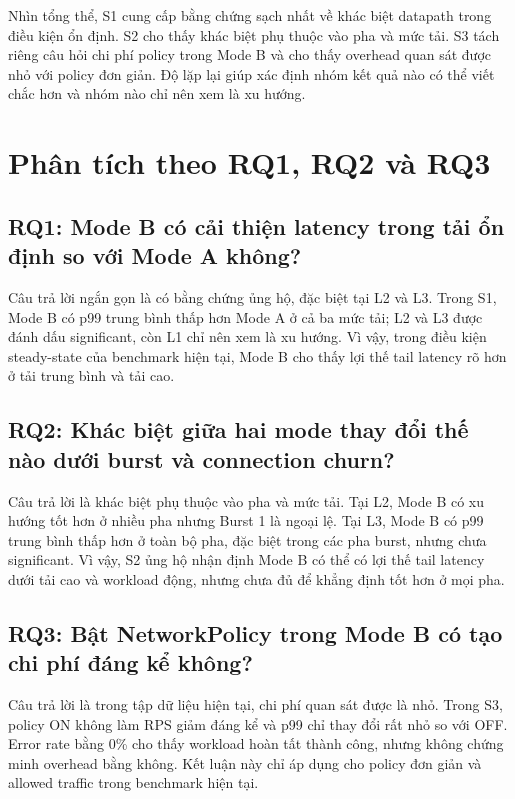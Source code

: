 Nhìn tổng thể, S1 cung cấp bằng chứng sạch nhất về khác biệt datapath trong điều kiện ổn định. S2 cho thấy khác biệt phụ thuộc vào pha và mức tải. S3 tách riêng câu hỏi chi phí policy trong Mode B và cho thấy overhead quan sát được nhỏ với policy đơn giản. Độ lặp lại giúp xác định nhóm kết quả nào có thể viết chắc hơn và nhóm nào chỉ nên xem là xu hướng.

\section{Phân tích theo RQ1, RQ2 và RQ3}

\subsection{RQ1: Mode B có cải thiện latency trong tải ổn định so với Mode A không?}

Câu trả lời ngắn gọn là có bằng chứng ủng hộ, đặc biệt tại L2 và L3. Trong S1, Mode B có p99 trung bình thấp hơn Mode A ở cả ba mức tải; L2 và L3 được đánh dấu significant, còn L1 chỉ nên xem là xu hướng. Vì vậy, trong điều kiện steady-state của benchmark hiện tại, Mode B cho thấy lợi thế tail latency rõ hơn ở tải trung bình và tải cao.

\subsection{RQ2: Khác biệt giữa hai mode thay đổi thế nào dưới burst và connection churn?}

Câu trả lời là khác biệt phụ thuộc vào pha và mức tải. Tại L2, Mode B có xu hướng tốt hơn ở nhiều pha nhưng Burst 1 là ngoại lệ. Tại L3, Mode B có p99 trung bình thấp hơn ở toàn bộ pha, đặc biệt trong các pha burst, nhưng chưa significant. Vì vậy, S2 ủng hộ nhận định Mode B có thể có lợi thế tail latency dưới tải cao và workload động, nhưng chưa đủ để khẳng định tốt hơn ở mọi pha.

\subsection{RQ3: Bật NetworkPolicy trong Mode B có tạo chi phí đáng kể không?}

Câu trả lời là trong tập dữ liệu hiện tại, chi phí quan sát được là nhỏ. Trong S3, policy ON không làm RPS giảm đáng kể và p99 chỉ thay đổi rất nhỏ so với OFF. Error rate bằng 0\% cho thấy workload hoàn tất thành công, nhưng không chứng minh overhead bằng không. Kết luận này chỉ áp dụng cho policy đơn giản và allowed traffic trong benchmark hiện tại.

